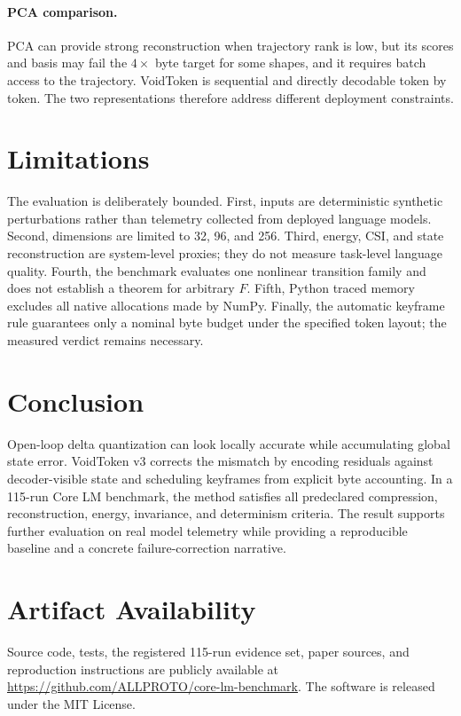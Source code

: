 \documentclass[10pt]{article}
\begin{document}
\paragraph{PCA comparison.}
PCA can provide strong reconstruction when trajectory rank is low, but its
scores and basis may fail the $4\times$ byte target for some shapes, and it
requires batch access to the trajectory. VoidToken is sequential and directly
decodable token by token. The two representations therefore address different
deployment constraints.

\section{Limitations}

The evaluation is deliberately bounded. First, inputs are deterministic
synthetic perturbations rather than telemetry collected from deployed language
models. Second, dimensions are limited to 32, 96, and 256. Third, energy, CSI,
and state reconstruction are system-level proxies; they do not measure
task-level language quality. Fourth, the benchmark evaluates one nonlinear
transition family and does not establish a theorem for arbitrary $F$. Fifth,
Python traced memory excludes all native allocations made by NumPy. Finally,
the automatic keyframe rule guarantees only a nominal byte budget under the
specified token layout; the measured verdict remains necessary.

\section{Conclusion}

Open-loop delta quantization can look locally accurate while accumulating
global state error. VoidToken v3 corrects the mismatch by encoding residuals
against decoder-visible state and scheduling keyframes from explicit byte
accounting. In a 115-run Core LM benchmark, the method satisfies all
predeclared compression, reconstruction, energy, invariance, and determinism
criteria. The result supports further evaluation on real model telemetry while
providing a reproducible baseline and a concrete failure-correction narrative.

\section*{Artifact Availability}

Source code, tests, the registered 115-run evidence set, paper sources, and
reproduction instructions are publicly available at
\url{https://github.com/ALLPROTO/core-lm-benchmark}. The software is released
under the MIT License.
\end{document}
